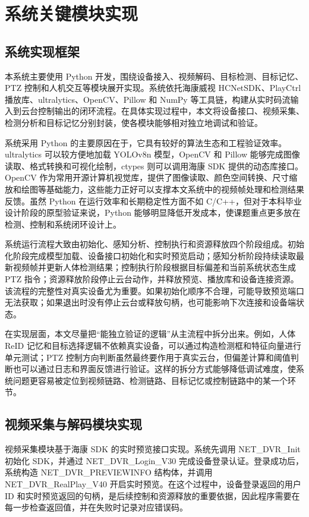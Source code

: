 \chapter{系统关键模块实现}

\section{系统实现框架}

本系统主要使用 Python 开发，围绕设备接入、视频解码、目标检测、目标记忆、PTZ 控制和人机交互等模块展开实现。系统依托海康威视 HCNetSDK、PlayCtrl 播放库、ultralytics、OpenCV、Pillow 和 NumPy 等工具链，构建从实时码流输入到云台控制输出的闭环流程。在具体实现过程中，本文将设备接口、视频采集、检测分析和目标记忆分别封装，使各模块能够相对独立地调试和验证。

系统采用 Python 的主要原因在于，它具有较好的算法生态和工程验证效率。ultralytics 可以较方便地加载 YOLOv8n 模型，OpenCV 和 Pillow 能够完成图像读取、格式转换和可视化绘制，ctypes 则可以调用海康 SDK 提供的动态库接口。OpenCV 作为常用开源计算机视觉库，提供了图像读取、颜色空间转换、尺寸缩放和绘图等基础能力\cite{bradski_opencv_2000}，这些能力正好可以支撑本文系统中的视频帧处理和检测结果反馈。虽然 Python 在运行效率和长期稳定性方面不如 C/C++，但对于本科毕业设计阶段的原型验证来说，Python 能够明显降低开发成本，使课题重点更多放在检测、控制和系统闭环设计上。

系统运行流程大致由初始化、感知分析、控制执行和资源释放四个阶段组成。初始化阶段完成模型加载、设备接口初始化和实时预览启动；感知分析阶段持续读取最新视频帧并更新人体检测结果；控制执行阶段根据目标偏差和当前系统状态生成 PTZ 指令；资源释放阶段停止云台动作，并释放预览、播放库和设备连接资源。该流程的完整性对真实设备尤为重要。如果初始化顺序不合理，可能导致预览端口无法获取；如果退出时没有停止云台或释放句柄，也可能影响下次连接和设备端状态。

在实现层面，本文尽量把“能独立验证的逻辑”从主流程中拆分出来。例如，人体 ReID 记忆和目标选择逻辑不依赖真实设备，可以通过构造检测框和特征向量进行单元测试；PTZ 控制方向判断虽然最终要作用于真实云台，但偏差计算和阈值判断也可以通过日志和界面反馈进行验证。这样的拆分方式能够降低调试难度，使系统问题更容易被定位到视频链路、检测链路、目标记忆或控制链路中的某一个环节。

\section{视频采集与解码模块实现}

视频采集模块基于海康 SDK 的实时预览接口实现。系统先调用 NET\_DVR\_Init 初始化 SDK，并通过 NET\_DVR\_Login\_V30 完成设备登录认证。登录成功后，系统构造 NET\_DVR\_PREVIEWINFO 结构体，并调用 NET\_DVR\_RealPlay\_V40 开启实时预览。在这个过程中，设备登录返回的用户 ID 和实时预览返回的句柄，是后续控制和资源释放的重要依据，因此程序需要在每一步检查返回值，并在失败时记录对应错误码。

